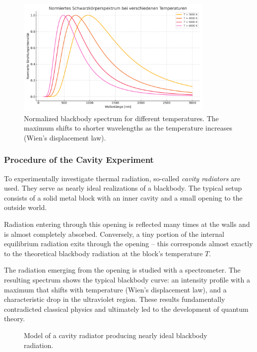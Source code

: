 \begin{figure}[H]
	\centering
	\includegraphics[width=0.85\textwidth]{bilder/schwarzer_koerper_spektrum.png}
	\caption{Normalized blackbody spectrum for different temperatures. The maximum shifts to shorter wavelengths as the temperature increases (Wien’s displacement law).}
	\label{fig:schwarzerkoerper}
\end{figure}
\subsubsection{Procedure of the Cavity Experiment}

To experimentally investigate thermal radiation, so-called \emph{cavity radiators} are used. They serve as nearly ideal realizations of a blackbody. The typical setup consists of a solid metal block with an inner cavity and a small opening to the outside world.

Radiation entering through this opening is reflected many times at the walls and is almost completely absorbed. Conversely, a tiny portion of the internal equilibrium radiation exits through the opening – this corresponds almost exactly to the theoretical blackbody radiation at the block’s temperature \( T \).  

The radiation emerging from the opening is studied with a spectrometer. The resulting spectrum shows the typical blackbody curve: an intensity profile with a maximum that shifts with temperature (Wien’s displacement law), and a characteristic drop in the ultraviolet region. These results fundamentally contradicted classical physics and ultimately led to the development of quantum theory.

\begin{figure}[H]
	\centering
	\caption{Model of a cavity radiator producing nearly ideal blackbody radiation.}
\end{figure}
